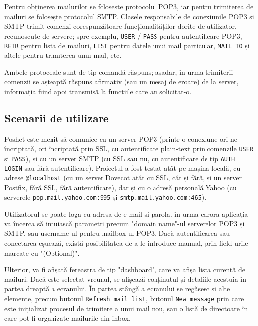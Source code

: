 \documentclass[runningheads]{llncs}
\begin{document}
Pentru obținerea mailurilor se folosește protocolul POP3\cite{ref_rfc_pop3}, iar pentru trimiterea de mailuri se folosește protocolul SMTP\cite{ref_rfc_smtp}. Clasele responsabile de conexiunile POP3 și SMTP trimit comenzi corespunzătoare funcționalităților dorite de utilizator, recunoscute de servere; spre exemplu, \texttt{USER} / \texttt{PASS} pentru autentificare POP3, \texttt{RETR} pentru lista de mailuri, \texttt{LIST} pentru datele unui mail particular, \texttt{MAIL TO} și altele pentru trimiterea unui mail, etc.

Ambele protocoale sunt de tip comandă-răspuns; așadar, în urma trimiterii comenzii se așteaptă răspuns afirmativ (sau un mesaj de eroare) de la server, informația fiind apoi transmisă la funcțiile care au solicitat-o.

\subsection{Scenarii de utilizare}
Poshet este menit să comunice cu un server POP3 (printr-o conexiune ori ne-încriptată, ori încriptată prin SSL, cu autentificare plain-text prin comenzile \texttt{USER} și \texttt{PASS}), și cu un server SMTP (cu SSL sau nu, cu autentificare de tip \texttt{AUTH LOGIN} sau fără autentificare). Proiectul a fost testat atât pe mașina locală, cu adrese \texttt{@localhost} (cu un server Dovecot atât cu SSL, cât și fără, și un server Postfix, fără SSL, fără autentificare), dar și cu o adresă personală Yahoo (cu serverele \texttt{pop.mail.yahoo.com:995} și \texttt{smtp.mail.yahoo.com:465}).


Utilizatorul se poate loga cu adresa de e-mail și parola, în urma cărora aplicația va încerca să intuiască parametri precum "domain name"-ul serverelor POP3 și SMTP, sau username-ul pentru mailbox-ul POP3. Dacă autentificarea sau conectarea eșuează, există posibilitatea de a le introduce manual, prin field-urile marcate cu "(Optional)".

Ulterior, va fi afișată fereastra de tip "dashboard", care va afișa lista curentă de mailuri. Dacă este selectat vreunul, se afișează conținutul și detaliile acestuia în partea dreaptă a ecranului. În partea stângă a ecranului se regăsesc și alte elemente, precum butonul \texttt{Refresh mail list}, butonul \texttt{New message} prin care este inițializat procesul de trimitere a unui mail nou, sau o listă de directoare în care pot fi organizate mailurile din inbox.
\end{document}
